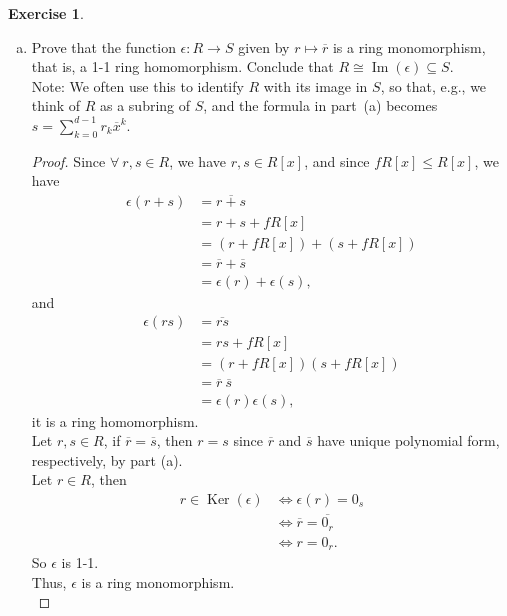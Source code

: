 \documentclass{amsart}
\renewcommand{\ker}{\operatorname{Ker}}
\newcommand{\im}{\operatorname{Im}}
\theoremstyle{plain}
\theoremstyle{definition}
\newtheorem{exer}[lem]{Exercise}
\begin{document}
\begin{exer}
\begin{enumerate}[(a)]
\begin{proof}
 Then
 \[\deg(r_k) = \deg(\overline{r\prime_k}) = 0.\]
So such $r_k \in R$ is unique for $k=0,1,\ldots,d-
1$.\\
Therefore, for every element $s\in S$, there exists unique elements $r_0,\ldots,r_{d-1}\in R$ such that $s=\sum_{k=0}^{d-1}\overline{r_k}\ \overline{x}^k$.
\end{proof}
\item Prove that the function $\epsilon\colon R\to S$ given by $r\mapsto\overline r$ is a ring monomorphism, that is, a 1-1 ring homomorphism.
Conclude that $R\cong\im(\epsilon)\subseteq S$.\\
Note: We often use this to identify $R$ with its image in $S$, so that, e.g., we think of $R$ as a subring of $S$, and the formula in part~(a) becomes $s=\sum_{k=0}^{d-1}r_k \overline{x}^k$.
\begin{proof}
  Since $\forall \ r,s \in R$, we have $r,s\in R[x]$, and since $fR[x] \leq R[x]$, we have
	\begin{align*}
	  \epsilon(r+s) &=\overline{r+s} \\ 
	  				&=r+s+fR[x]\\
	  				&=(r+fR[x]) + (s+fR[x]) \\
	  				&=\overline{r} + \overline{s} \\
	  				&=\epsilon(r)+\epsilon(s),
	\end{align*}
	and 
	\begin{align*}
	  \epsilon(rs) &=\overline{rs} \\ 
	  				&=rs+fR[x]\\
	  				&=(r+fR[x])(s+fR[x]) \\
	  				&=\overline{r}~ \overline{s} \\
	  				&=\epsilon(r)\epsilon(s),
	\end{align*}
	it is a ring homomorphism.\\
	Let $r, s \in R$, if $\overline{r} = \overline{s}$, then $r=s$ since $\overline{r}$ and $\overline{s}$ have unique polynomial form, respectively, by part (a).\\
	Let $r \in R$, then  
	\begin{align*}
	  r \in \ker(\epsilon) &\Longleftrightarrow \epsilon(r) = 0_s \\
&\Longleftrightarrow \overline{r} = \overline{0_r} \\
&\Longleftrightarrow r = 0_r. 
	\end{align*}
	So $\epsilon$ is 1-1.\\
	Thus, $\epsilon$ is a ring monomorphism.\\

\end{proof}
\end{enumerate}
\end{exer}
\end{document}
